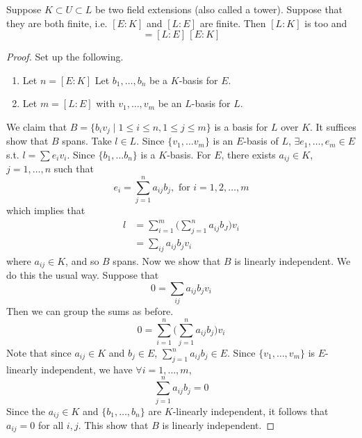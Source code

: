   \begin{lemma}
    Suppose $K \subset U \subset L$ be two field extensions (also called a tower). Suppose that they are both finite, i.e. $[E:K]$ and $[L:E]$ are finite. Then $[L:K]$ is too and 
    \begin{equation}
      [L:K] = [L:E]\, [E:K]
    \end{equation}
  \end{lemma}
  \begin{proof} 
    Set up the following. 
    \begin{enumerate}
      \item Let $n = [E:K]$ Let $b_1, \ldots, b_n$ be a $K$-basis for $E$. 
      \item Let $m = [L:E]$ with $v_1, \ldots, v_m$ be an $L$-basis for $L$. 
    \end{enumerate}

    We claim that $B = \{ b_i v_j \mid 1 \leq i \leq n, 1 \leq j \leq m\}$ is a basis for $L$ over $K$. It suffices show that $B$ spans. Take $l \in L$. Since $\{v_1, \ldots v_m\}$ is an $E$-basis of $L$, $\exists  e_1, \ldots, e_m \in E$ s.t. $l = \sum e_i v_i$. Since $\{b_1, \ldots b_n\}$ is a $K$-basis. For $E$, there exists $a_{ij}\in K$, $j = 1, \ldots, n$ such that 
    \begin{equation}
      e_i = \sum_{j=1}^n a_{ij} b_j, \text{ for } i = 1, 2, \ldots, m
    \end{equation}
    which implies that 
    \begin{align}
      l & = \sum_{i=1}^m \bigg( \sum_{j=1}^n a_{ij} b_J \bigg) v_i \\ 
        & = \sum_{ij} a_{ij} b_j v_i
    \end{align} 
    where $a_{ij} \in K$, and so $B$ spans. Now we show that $B$ is linearly independent. We do this the usual way. Suppose that 
    \begin{equation}
      0 = \sum_{ij} a_{ij} b_j v_i
    \end{equation}
    Then we can group the sums as before. 
    \begin{equation}
      0 = \sum_{i=1}^n \bigg( \sum_{j=1}^n a_{ij} b_j \bigg) v_i 
    \end{equation}
    Note that since $a_{ij} \in K$ and $b_j \in E$, $\sum_{j=1}^n a_{ij} b_j \in E$. Since $\{v_1, \ldots, v_m\}$ is $E$-linearly independent, we have $\forall i = 1, \ldots, m$, 
    \begin{equation}
      \sum_{j=1}^n a_{ij} b_j = 0
    \end{equation}
    Since the $a_{ij} \in K$ and $\{b_1, \ldots, b_n\}$ are $K$-linearly independent, it follows that $a_{ij} = 0$ for all $i, j$. This show that $B$ is linearly independent. 
  \end{proof} 

